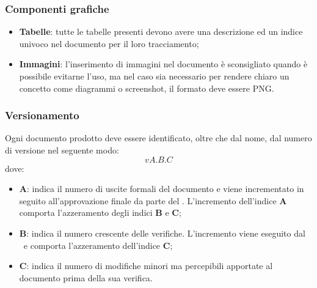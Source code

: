 \documentclass[../NormeDiProgetto.tex]{subfiles}
\begin{document}
\subsubsection{Componenti grafiche}
\begin{itemize}

\item \textbf{Tabelle}: tutte le tabelle presenti devono avere una descrizione ed un indice univoco nel documento per il loro tracciamento;
\item \textbf{Immagini}: l'inserimento di immagini nel documento è sconsigliato quando è possibile evitarne l'uso, ma nel caso sia necessario per rendere chiaro un concetto come diagrammi o screenshot, il formato deve essere PNG.
\end{itemize}

\subsubsection{Versionamento}
Ogni documento prodotto deve essere identificato, oltre che dal nome, dal numero
di versione nel seguente modo:
\begin{equation*}
  vA.B.C
\end{equation*}
dove:
\begin{itemize}
  \item \textbf{A}: indica il numero di uscite formali del documento e viene
  incrementato in seguito all'approvazione finale da parte del \responsabilediprogetto.
  L'incremento dell'indice \textbf{A} comporta l'azzeramento degli indici
  \textbf{B} e \textbf{C};
  \item \textbf{B}: indica il numero crescente delle verifiche. L'incremento viene 	eseguito dal \verificatore\ e comporta l'azzeramento dell'indice \textbf{C};
  \item \textbf{C}: indica il numero di modifiche minori ma percepibili apportate al documento prima della sua verifica.
  \end{itemize}
\end{document}
